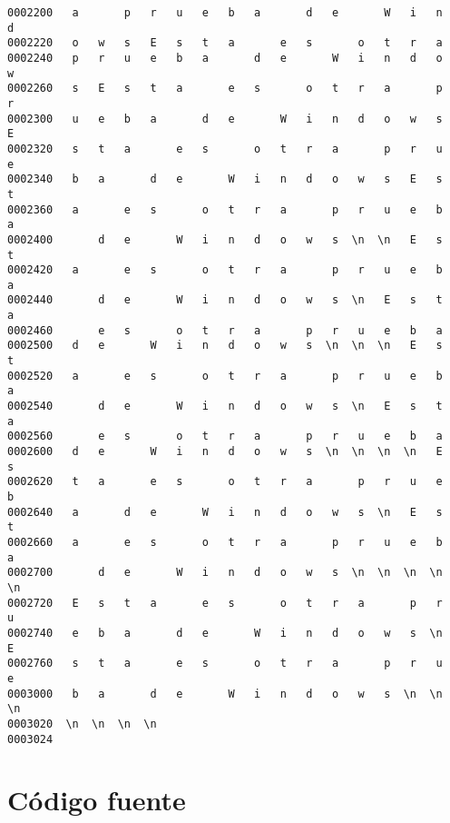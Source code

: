 \documentclass[a4paper,11pt]{article}
\begin{document}
\begin{itemize}
\begin{verbatim}
0002200   a       p   r   u   e   b   a       d   e       W   i   n   d
0002220   o   w   s   E   s   t   a       e   s       o   t   r   a    
0002240   p   r   u   e   b   a       d   e       W   i   n   d   o   w
0002260   s   E   s   t   a       e   s       o   t   r   a       p   r
0002300   u   e   b   a       d   e       W   i   n   d   o   w   s   E
0002320   s   t   a       e   s       o   t   r   a       p   r   u   e
0002340   b   a       d   e       W   i   n   d   o   w   s   E   s   t
0002360   a       e   s       o   t   r   a       p   r   u   e   b   a
0002400       d   e       W   i   n   d   o   w   s  \n  \n   E   s   t
0002420   a       e   s       o   t   r   a       p   r   u   e   b   a
0002440       d   e       W   i   n   d   o   w   s  \n   E   s   t   a
0002460       e   s       o   t   r   a       p   r   u   e   b   a    
0002500   d   e       W   i   n   d   o   w   s  \n  \n  \n   E   s   t
0002520   a       e   s       o   t   r   a       p   r   u   e   b   a
0002540       d   e       W   i   n   d   o   w   s  \n   E   s   t   a
0002560       e   s       o   t   r   a       p   r   u   e   b   a    
0002600   d   e       W   i   n   d   o   w   s  \n  \n  \n  \n   E   s
0002620   t   a       e   s       o   t   r   a       p   r   u   e   b
0002640   a       d   e       W   i   n   d   o   w   s  \n   E   s   t
0002660   a       e   s       o   t   r   a       p   r   u   e   b   a
0002700       d   e       W   i   n   d   o   w   s  \n  \n  \n  \n  \n
0002720   E   s   t   a       e   s       o   t   r   a       p   r   u
0002740   e   b   a       d   e       W   i   n   d   o   w   s  \n   E
0002760   s   t   a       e   s       o   t   r   a       p   r   u   e
0003000   b   a       d   e       W   i   n   d   o   w   s  \n  \n  \n
0003020  \n  \n  \n  \n
0003024
\end{verbatim}
\end{itemize}

\section{C\'odigo fuente}
\end{document}
